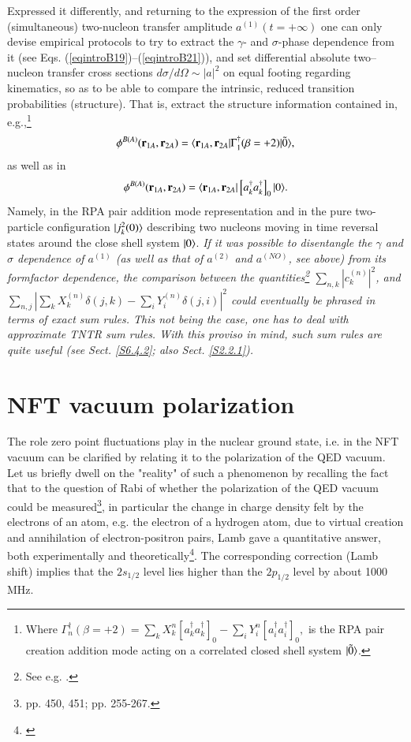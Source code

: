 \begin{subappendices}
 
 Expressed it differently, and returning to the expression of the first order (simultaneous) two-nucleon transfer amplitude $a^{(1)}(t=+\infty)$ one can only devise empirical protocols to try to extract the $\gamma$- and $\sigma$-phase dependence  from it (see Eqs. (\ref{eqintroB19})--(\ref{eqintroB21})), and set differential absolute two--nucleon transfer cross sections $d\sigma/d\Omega\sim |a|^2$ on equal footing regarding kinematics, so as to be able to compare the intrinsic, reduced transition probabilities (structure). That is, extract the structure information contained in, e.g.,\footnote{Where
 	$\Gamma_n^\dagger(\beta=+2)=\sum_k X_k^n\left[a^\dagger_ka^\dagger_k\right]_0-\sum_i Y^n_i \left[a^\dagger_i a^\dagger_i\right]_0,$
 	is the RPA pair creation addition mode acting on  a correlated closed shell system $|{\tilde 0} \rangle$. }
 \begin{align}
 \phi^{B(A)}(\mathbf r_{1A},\mathbf r_{2A})=\langle {\mathbf r_{1A},\mathbf r_{2A}|\Gamma^\dagger_1(\beta=+2)|\tilde 0} \rangle,
 \end{align}
 as well as in
 \begin{align}\label{eq2.D.48}
 \phi^{B(A)}(\mathbf r_{1A},\mathbf r_{2A})=\langle {\mathbf r_{1A},\mathbf r_{2A}}|\left[a^\dagger_ka^\dagger_k\right]_0|{0} \rangle.
 \end{align}
 Namely, in the RPA pair addition mode representation and in the pure two-particle configuration $|{j^2_k(0)} \rangle$ describing two nucleons moving in time reversal states around the close shell system $|{0} \rangle$. \textit{If it was possible to disentangle the $\gamma$ and $\sigma$ dependence of $a^{(1)}$ (as well as that of $a^{(2)}$ and $a^{(NO)}$, see above) from its formfactor dependence, the comparison between the quantities\footnote{See e.g. \cite{Broglia:67}.} $\sum_{n,k}|c^{(n)}_k|^2$, and\\ $\sum_{n,j}\left|\sum_kX^{(n)}_k\delta(j,k)-\sum_iY^{(n)}_i\delta(j,i)\right|^2$ could  eventually be phrased in terms of exact sum rules. This not being  the case, one has to  deal with approximate TNTR sum rules. With this proviso in mind, such sum rules are quite useful (see Sect. \ref{S6.4.2}; also  Sect. \ref{S2.2.1}).} 
 
 
 \section{NFT vacuum polarization}\label{App1.E}
 The role zero point fluctuations play in the nuclear ground state, i.e. in the NFT vacuum  can
 be  clarified by relating it to the polarization of the QED vacuum.
 Let us briefly dwell on the "reality" of such a phenomenon by recalling the fact that
 to the question of Rabi of whether the polarization of the QED vacuum could be measured\footnote{\cite{Pais:86} pp. 450, 451; \cite{Pais:00} pp. 255-267.}, in particular
 the change in charge  density felt by the electrons of an atom,  e.g. the electron of a hydrogen atom, due to
 virtual creation and annihilation of electron-positron pairs,  Lamb gave a quantitative answer, both experimentally
 and theoretically\footnote{\cite{Lamb:47,Kroll:49}}. The corresponding correction  (Lamb shift) implies that the $2s_{1/2}$ level lies 
 higher than the $2p_{1/2}$ level by about 1000 MHz.  
 

\end{subappendices}
